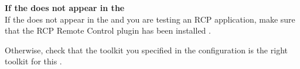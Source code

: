 \textbf{If the \gdaut{} does not appear in the \gdrunautview{}}\\
If the \gdaut{} does not appear in the \gdrunautview{} and you are testing an RCP application, make sure that the RCP Remote Control plugin has been installed . 

Otherwise, check that the toolkit you specified in the \gdaut{} configuration  is the right toolkit for this \gdaut{}. 

